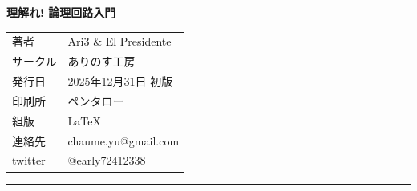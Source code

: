 \vspace{1em}

\begin{center}
{\bfseries 理解れ! 論理回路入門}
\end{center}

\vspace{1em}

\noindent
\begin{tabular}{@{}ll@{}}

著者 & Ari3 \quad \& \quad El Presidente \\
サークル & ありのす工房 \\ 
発行日 & 2025年12月31日 初版\\
印刷所 & ペンタロー\\
組版 & \LaTeX \\
連絡先 & chaume.yu@gmail.com\\
twitter &  @early72412338
\end{tabular}

\vspace{1em}

\noindent\rule{\textwidth}{0.4pt}

